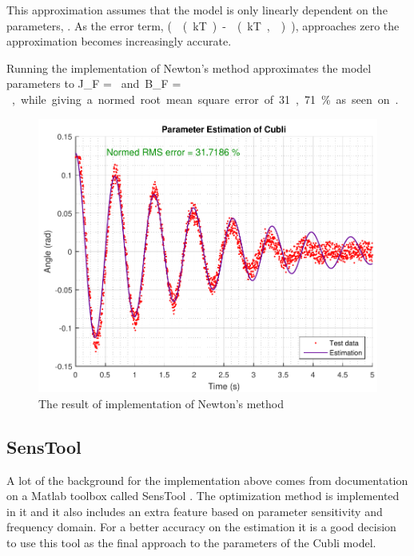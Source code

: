 %
This approximation assumes that the model is only linearly dependent on the parameters, \si{\vec{\theta}}. As the error term, \si{((kT) - (kT, \vec{\theta}))}, approaches zero the approximation becomes increasingly accurate.

Running the implementation of Newton's method approximates the model parameters to \si{J_F = } and \si{B_F = }, while giving a normed root mean square error of \si{31,71 \%} as seen on . %

\begin{figure}[H] 
	\centering
	\includegraphics[width=.8\textwidth]{figures/ParameterEstimationNewtonCubli}
	\caption{The result of implementation of Newton's method}
	\label{ParameterEstimationNewtonCubli}
\end{figure}

\subsection{SensTool}
A lot of the background for the implementation above comes from documentation on a Matlab toolbox called SensTool . The optimization method is implemented in it and it also includes an extra feature based on parameter sensitivity and frequency domain. For a better accuracy on the estimation it is a good decision to use this tool as the final approach to the parameters of the Cubli model.

